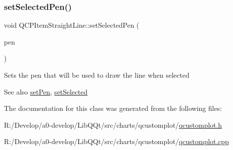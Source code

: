 \subsubsection{\texorpdfstring{set\+Selected\+Pen()}{setSelectedPen()}}
{\footnotesize\ttfamily void Q\+C\+P\+Item\+Straight\+Line\+::set\+Selected\+Pen (\begin{DoxyParamCaption}\item[{const Q\+Pen \&}]{pen }\end{DoxyParamCaption})}

Sets the pen that will be used to draw the line when selected

\begin{DoxySeeAlso}{See also}
\mbox{\hyperlink{class_q_c_p_item_straight_line_a9f36c9c9e60d7d9ac084c80380ac8601}{set\+Pen}}, \mbox{\hyperlink{class_q_c_p_abstract_item_a203de94ad586cc44d16c9565f49d3378}{set\+Selected}} 
\end{DoxySeeAlso}


The documentation for this class was generated from the following files\+:\begin{DoxyCompactItemize}
\item 
R\+:/\+Develop/a0-\/develop/\+Lib\+Q\+Qt/src/charts/qcustomplot/\mbox{\hyperlink{qcustomplot_8h}{qcustomplot.\+h}}\item 
R\+:/\+Develop/a0-\/develop/\+Lib\+Q\+Qt/src/charts/qcustomplot/\mbox{\hyperlink{qcustomplot_8cpp}{qcustomplot.\+cpp}}\end{DoxyCompactItemize}
